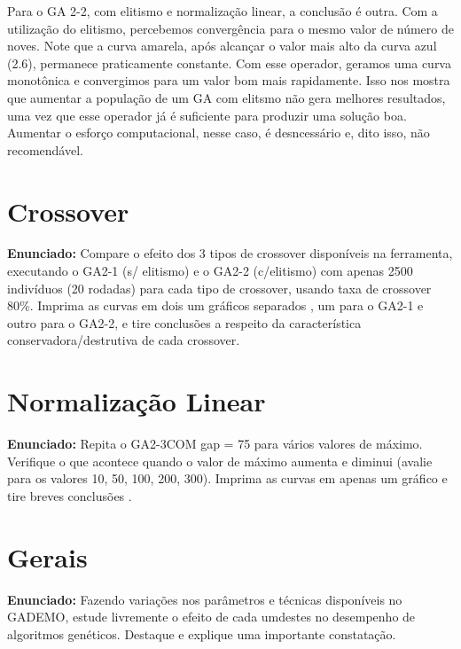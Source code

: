 \documentclass[12pt]{article}
\begin{document}
Para o GA 2-2, com elitismo e normalização linear, a conclusão é outra. Com a utilização do elitismo, percebemos convergência para o mesmo valor de número de noves. Note que a curva amarela, após alcançar o valor mais alto da curva azul (2.6), permanece praticamente constante. Com esse operador, geramos uma curva monotônica e convergimos para um valor bom mais rapidamente. Isso nos mostra que aumentar a população de um GA com elitsmo não gera melhores resultados, uma vez que esse operador já é suficiente para produzir uma solução boa. Aumentar o esforço computacional, nesse caso, é desncessário e, dito isso, não recomendável.

\section{Crossover}
\textbf{Enunciado:}
Compare o efeito dos 3 tipos de crossover disponíveis na ferramenta, executando o GA2-1 (s/ elitismo) e o GA2-2 (c/elitismo) com apenas 2500 indivíduos (20 rodadas) para cada tipo de crossover, usando taxa de crossover 80\%. Imprima as curvas em dois um gráficos separados , um para o GA2-1 e outro para o GA2-2, e tire conclusões a respeito da característica conservadora/destrutiva de cada crossover.


\section{Normalização Linear}
\textbf{Enunciado:}
Repita o GA2-3COM gap = 75 para vários valores de máximo. Verifique o que acontece quando o valor de máximo aumenta e diminui (avalie para os valores 10, 50, 100, 200, 300). Imprima as curvas em apenas um gráfico e tire breves conclusões .

\section{Gerais}
\textbf{Enunciado:}
Fazendo variações nos parâmetros e técnicas disponíveis no GADEMO, estude livremente o efeito de cada umdestes no desempenho de algoritmos genéticos. Destaque e explique uma importante constatação.

	 
	
\end{document}
